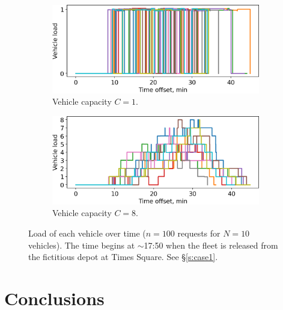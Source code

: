 \documentclass[12pt,notitlepage]{article}
\begin{document}
\begin{figure}[!p]
	\begin{subfigure}{0.5\textwidth}
		\includegraphics[width=\textwidth]{20210616-OPT1/c_grid_study0/UTC-00000000-Sample/plots/104/vehicle_load}
		\caption{Vehicle capacity $C = 1$.}
	\end{subfigure}
	\begin{subfigure}{0.5\textwidth}
		\includegraphics[width=\textwidth]{20210616-OPT1/c_grid_study0/UTC-00000000-Sample/plots/105/vehicle_load}
		
		\caption{Vehicle capacity $C = 8$.}
	\end{subfigure}
	
	\caption{%
		Load of each vehicle over time
		($n = 100$ requests for $N = 10$ vehicles).
		The time begins at $\sim$17:50 
		when the fleet is released 
		from the fictitious depot
		at Times Square.
		See \S\ref{s:case1}.
	}
	\label{f:case1-load}
\end{figure}








\section{Conclusions}

\end{document}
